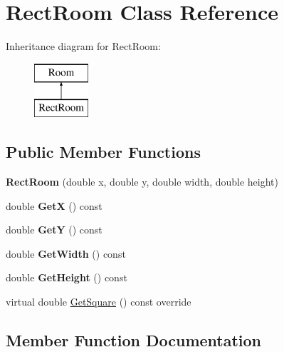 \hypertarget{class_rect_room}{}\section{Rect\+Room Class Reference}
\label{class_rect_room}
Inheritance diagram for Rect\+Room\+:\begin{figure}[H]
\begin{center}
\leavevmode
\includegraphics[height=2.000000cm]{class_rect_room}
\end{center}
\end{figure}
\subsection*{Public Member Functions}
\begin{DoxyCompactItemize}
\item 
\mbox{\label{class_rect_room_a444fad0f9f4214cc71050aeae4522316}} 
{\bfseries Rect\+Room} (double x, double y, double width, double height)
\item 
\mbox{\label{class_rect_room_aac644aa64bdbd3ed45e04280408d5759}} 
double {\bfseries GetX} () const
\item 
\mbox{\label{class_rect_room_ac451b16217c726a27a0ca153f4694e89}} 
double {\bfseries GetY} () const
\item 
\mbox{\label{class_rect_room_aab5c14d8e4f9a28535acdd3fb571b5aa}} 
double {\bfseries Get\+Width} () const
\item 
\mbox{\label{class_rect_room_aa0ce3fcbdf1d34a94d44cd3b417723bf}} 
double {\bfseries Get\+Height} () const
\item 
virtual double \mbox{\hyperlink{class_rect_room_a3308e46aa110d1b453d7a80cfbb5b5a2}{Get\+Square}} () const override
\end{DoxyCompactItemize}


\subsection{Member Function Documentation}
\mbox{\label{class_rect_room_a3308e46aa110d1b453d7a80cfbb5b5a2}} 
